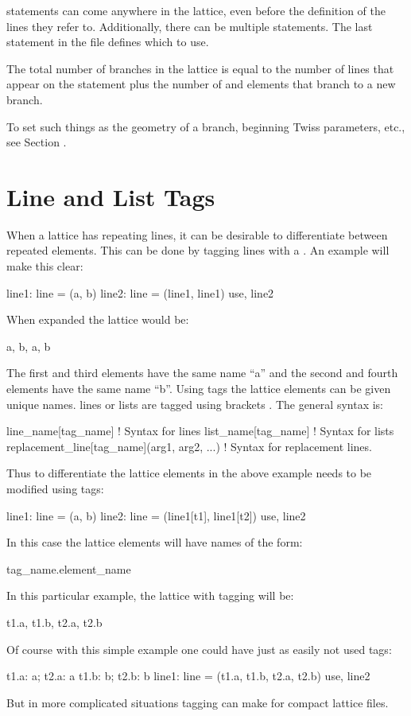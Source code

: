  statements can come anywhere in the lattice, even before the
definition of the lines they refer to. Additionally, there can be
multiple  statements.  The last  statement in the file
defines which  to use.

The total number of branches in the lattice is equal to the number of lines that appear on
the  statement plus the number of  and  elements that branch
to a new branch.

To set such things as the geometry of a branch, beginning Twiss parameters, etc., see Section
.

\section{Line and List Tags}
\label{s:tag}

When a lattice has repeating lines, it can be desirable to differentiate
between repeated elements. This can be done by tagging lines with a . 
An example will make this clear:
\begin{example}
  line1: line = (a, b)
  line2: line = (line1, line1)
  use, line2
\end{example}
When expanded the lattice would be:
\begin{example}
  a, b, a, b
\end{example}
The first and third elements have the same name ``a'' and the second and fourth
elements have the same name ``b''. Using tags the lattice elements can be given
unique names. lines or lists are tagged  
using brackets \vn{[...]}. The general syntax is:
\begin{example}
  line_name[tag_name]                           ! Syntax for lines
  list_name[tag_name]                           ! Syntax for lists
  replacement_line[tag_name](arg1, arg2, ...)   ! Syntax for replacement lines.
\end{example}
Thus to differentiate the lattice elements in the above example  needs to
be modified using tags:
\begin{example}
  line1: line = (a, b)
  line2: line = (line1[t1], line1[t2])
  use, line2
\end{example}
In this case the lattice elements will have names of the form:
\begin{example}
  tag_name.element_name
\end{example}
In this particular example, the lattice with tagging will be:
\begin{example}
  t1.a, t1.b, t2.a, t2.b
\end{example}
Of course with this simple example one could have just as easily not used tags:
\begin{example}
  t1.a: a;   t2.a: a
  t1.b: b;   t2.b: b
  line1: line = (t1.a, t1.b, t2.a, t2.b)
  use, line2
\end{example}
But in more complicated situations tagging can make for compact lattice files.

